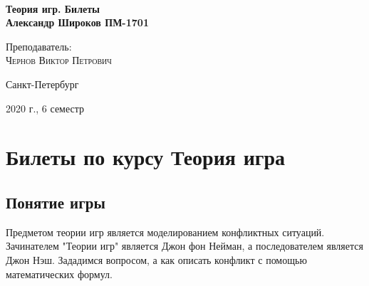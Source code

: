 \documentclass[aps,%
12pt,%
final,%
oneside,
onecolumn,%
musixtex, %
superscriptaddress,%
centertags]{article} %
\theoremstyle{plain}
\theoremstyle{definition}
\theoremstyle{remark}
\begin{document}
\begin{titlepage} 
\begin{center}
 
\textbf{}\\[10.0cm]
\textbf{\LARGE Теория игр. Билеты}\\[0.5cm]
\textbf{\Large Александр Широков ПМ-1701} \\[0.2cm]

\begin{center} \large
{Преподаватель:} \\[0.5cm]
\textsc {Чернов Виктор Петрович}\\
\end{center}
\vfill 


{\large {Санкт-Петербург}} \par
{\large {2020 г., 6 семестр}}
\end{center} 
\end{titlepage}

\begin{thebibliography}{3}
\end{thebibliography}
\tableofcontents
\newpage

\section{Билеты по курсу Теория игра}

\subsection{Понятие игры}

Предметом теории игр является моделированием конфликтных ситуаций. Зачинателем "Теории игр" является Джон фон Нейман, а последователем является Джон Нэш. Зададимся вопросом, а как описать конфликт с помощью математических формул. 
\end{document}
